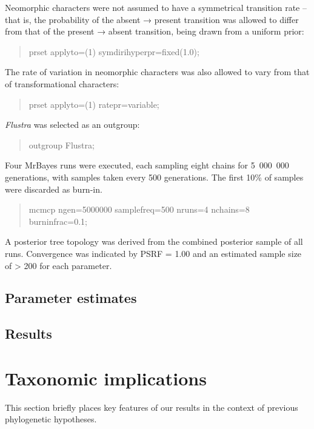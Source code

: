 \documentclass[openany]{book}
\theoremstyle{definition}
\theoremstyle{definition}
\theoremstyle{definition}
\theoremstyle{remark}
\begin{document}
Neomorphic characters were not assumed to have a symmetrical transition
rate -- that is, the probability of the absent → present transition was
allowed to differ from that of the present → absent transition, being
drawn from a uniform prior:

\begin{quote}
prset applyto=(1) symdirihyperpr=fixed(1.0);
\end{quote}

The rate of variation in neomorphic characters was also allowed to vary
from that of transformational characters:

\begin{quote}
prset applyto=(1) ratepr=variable;
\end{quote}

\emph{Flustra} was selected as an outgroup:

\begin{quote}
outgroup Flustra;
\end{quote}

Four MrBayes runs were executed, each sampling eight chains for
5~000~000 generations, with samples taken every 500 generations. The
first 10\% of samples were discarded as burn-in.

\begin{quote}
mcmcp ngen=5000000 samplefreq=500 nruns=4 nchains=8 burninfrac=0.1;
\end{quote}

A posterior tree topology was derived from the combined posterior sample
of all runs. Convergence was indicated by PSRF = 1.00 and an estimated
sample size of \textgreater{} 200 for each parameter.

\section{Parameter estimates}\label{parameter-estimates}

\section{Results}\label{results-2}

\chapter{Taxonomic implications}\label{taxonomic-implications}

This section briefly places key features of our results in the context
of previous phylogenetic hypotheses.
\end{document}
